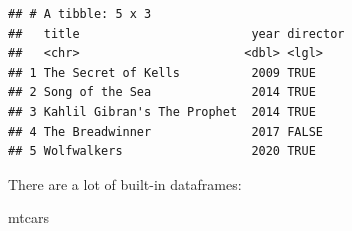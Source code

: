 \documentclass[
]{book}
\newenvironment{Shaded}{\begin{snugshade}}{\end{snugshade}}
\newcommand{\NormalTok}[1]{#1}
\begin{document}
\begin{verbatim}
## # A tibble: 5 x 3
##   title                        year director
##   <chr>                       <dbl> <lgl>   
## 1 The Secret of Kells          2009 TRUE    
## 2 Song of the Sea              2014 TRUE    
## 3 Kahlil Gibran's The Prophet  2014 TRUE    
## 4 The Breadwinner              2017 FALSE   
## 5 Wolfwalkers                  2020 TRUE
\end{verbatim}

There are a lot of built-in dataframes:

\begin{Shaded}
\begin{Highlighting}[]
\NormalTok{mtcars}
\end{Highlighting}
\end{Shaded}
\end{document}
